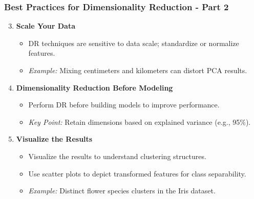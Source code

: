 \documentclass[aspectratio=169]{beamer}
\begin{document}
\begin{frame}[fragile]
    \frametitle{Best Practices for Dimensionality Reduction - Part 2}
    \begin{enumerate}
        \setcounter{enumi}{2}
        \item \textbf{Scale Your Data}
        \begin{itemize}
            \item DR techniques are sensitive to data scale; standardize or normalize features.
            \item \textit{Example:} Mixing centimeters and kilometers can distort PCA results.
        \end{itemize}

        \item \textbf{Dimensionality Reduction Before Modeling}
        \begin{itemize}
            \item Perform DR before building models to improve performance.
            \item \textit{Key Point:} Retain dimensions based on explained variance (e.g., 95\%).
        \end{itemize}

        \item \textbf{Visualize the Results}
        \begin{itemize}
            \item Visualize the results to understand clustering structures.
            \item Use scatter plots to depict transformed features for class separability.
            \item \textit{Example:} Distinct flower species clusters in the Iris dataset.
        \end{itemize}
    \end{enumerate}
\end{frame}
\end{document}
